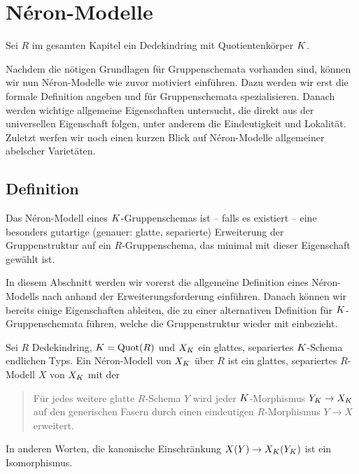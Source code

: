 \chapter{Néron-Modelle}\label{chap:neronmodelle}
Sei $R$ im gesamten Kapitel ein Dedekindring mit Quotientenkörper
$K$.

Nachdem die nötigen Grundlagen für Gruppenschemata vorhanden sind,
können wir nun Néron-Modelle wie zuvor motiviert einführen.
Dazu werden wir erst die formale Definition angeben und für
Gruppenschemata spezialisieren. Danach werden wichtige
allgemeine Eigenschaften untersucht, die direkt aus der universellen
Eigenschaft folgen, unter anderem die Eindeutigkeit und
Lokalität.
Zuletzt werfen wir noch einen kurzen Blick auf Néron-Modelle
allgemeiner abelscher Varietäten.

\section{Definition}
Das Néron-Modell eines $K$-Gruppenschemas ist – falls es existiert –
eine besonders gutartige (genauer: glatte, separierte) Erweiterung der
Gruppenstruktur auf ein $R$-Gruppenschema, das
minimal mit dieser Eigenschaft gewählt ist.

In diesem Abschnitt werden wir vorerst die allgemeine Definition eines
Néron-Modells nach \cite[1.2, Definition 1]{neron} anhand der
Erweiterungsforderung einführen. Danach können wir bereits einige
Eigenschaften ableiten, die zu einer alternativen Definition für
$K$-Gruppenschemata führen, welche die Gruppenstruktur wieder mit
einbezieht.

\begin{Definition}
  Sei $R$ Dedekindring, $K=\operatorname{Quot}(R)$ und
  $X_{K}$ ein glattes, separiertes $K$-Schema endlichen Typs.
  Ein Néron-Modell von $X_{K}$ über $R$ ist ein glattes, separiertes
  $R$-Modell $X$ von $X_{K}$ mit der \NAbbEig
  \begin{quote}
    Für jedes weitere glatte $R$-Schema $Y$ wird jeder
    $K$-Morphismus $Y_{K}\to X_{K}$ auf den generischen Fasern durch
    einen eindeutigen $R$-Morphismus $Y\to X$ erweitert.
  \end{quote}
  In anderen Worten, die kanonische Einschränkung $X(Y)\to
  X_{K}(Y_{K})$ ist ein Isomorphismus.
\end{Definition}

